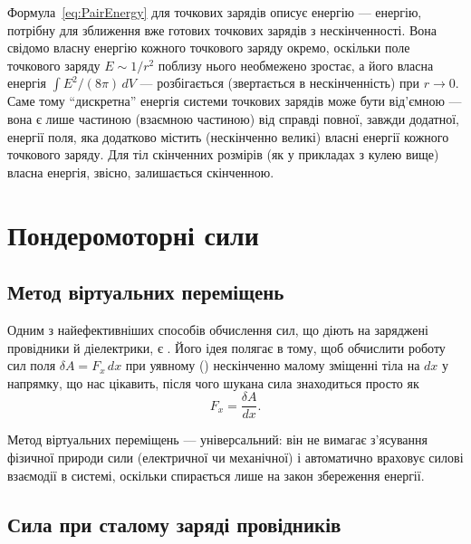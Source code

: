 \begin{Attention}
	Формула~\eqref{eq:PairEnergy} для точкових зарядів описує  енергію --- енергію, потрібну для зближення вже готових точкових
	зарядів з нескінченності. Вона свідомо  власну енергію кожного точкового заряду окремо, оскільки поле точкового заряду
	$E \sim 1/r^2$ поблизу нього необмежено зростає, а його власна енергія $\int E^2/(8\pi)\, dV$ --- розбігається (звертається в нескінченність) при
	$r \to 0$. Саме тому \enquote{дискретна} енергія системи точкових зарядів може бути від'ємною --- вона є лише частиною (взаємною частиною) від
	справді повної, завжди додатної, енергії поля, яка додатково містить (нескінченно великі) власні енергії кожного точкового заряду. Для тіл
	скінченних розмірів (як у прикладах з кулею вище) власна енергія, звісно, залишається скінченною.
\end{Attention}

\section{Пондеромоторні сили}

\subsection*{Метод віртуальних переміщень}

Одним з найефективніших способів обчислення сил, що діють на заряджені провідники й діелектрики, є . Його ідея
полягає в тому, щоб обчислити роботу сил поля $\delta A = F_x\, dx$ при уявному () нескінченно малому зміщенні тіла на $dx$ у
напрямку, що нас цікавить, після чого шукана сила знаходиться просто як
\begin{equation*}
	F_x = \frac{\delta A}{dx}.
\end{equation*}

\begin{Attention}
	Метод віртуальних переміщень --- універсальний: він не вимагає з'ясування фізичної природи сили (електричної чи механічної) і автоматично
	враховує  силові взаємодії в системі, оскільки спирається лише на закон збереження енергії.
\end{Attention}

\subsection*{Сила при сталому заряді провідників}

